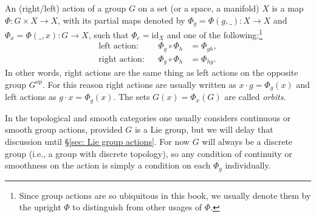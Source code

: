 \begin{defn}
    An (right/left) action of a group $G$ on a set (or a space, a manifold) $X$ is a map $\Phi: G\times X\to X$, with its partial maps denoted by $\Phi_g=\Phi (g,\_):X\to X$ and $\Phi_x=\Phi(\_,x):G\to X$, such that $\Phi_e=\mathrm{id}_X$ and one of the following:\footnote{Since group actions are so ubiquitous in this book, we usually denote them by the upright $\Phi$ to distinguish from other usages of $\varPhi$.}
    \begin{align}
        \text{left action}:&& \Phi_g\circ \Phi_h&=\Phi_{gh},\\
        \text{right action}:&& \Phi_g\circ \Phi_h&=\Phi_{hg}.
    \end{align}
    In other words, right actions are the same thing as left actions on the opposite group $G^{\mathrm{op}}$. For this reason right actions are usually written as $x\cdot g=\Phi_g(x)$ and left actions as $g\cdot x=\Phi_g(x)$. The sets $G(x)=\Phi_x(G)$ are called \emph{orbits}.
\end{defn}
In the topological and smooth categories one usually considers continuous or smooth group actions, provided $G$ is a Lie group, but we will delay that discussion until \S\ref{sec: Lie group actions}. For now $G$ will always be a discrete group (i.e., a group with discrete topology), so any condition of continuity or smoothness on the action is simply a condition on each $\Phi_g$ individually.

